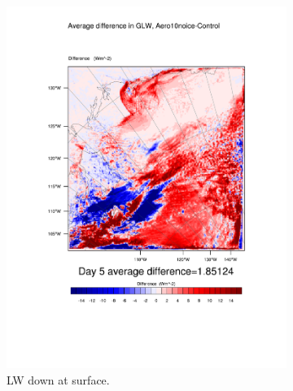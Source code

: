 \begin{figure}
	\begin{subfigure}{0.48\textwidth}
		\centering
		\includegraphics[width=\textwidth]{results/aero10ni/diff_Aero10NoIce_GLW_Day5.pdf}
		\caption{LW down at surface.}
		\label{subfig:glw_r4Day5}
	\end{subfigure}
	\quad
	\begin{subfigure}{0.48\textwidth}
		\centering

\end{subfigure}
\end{figure}
